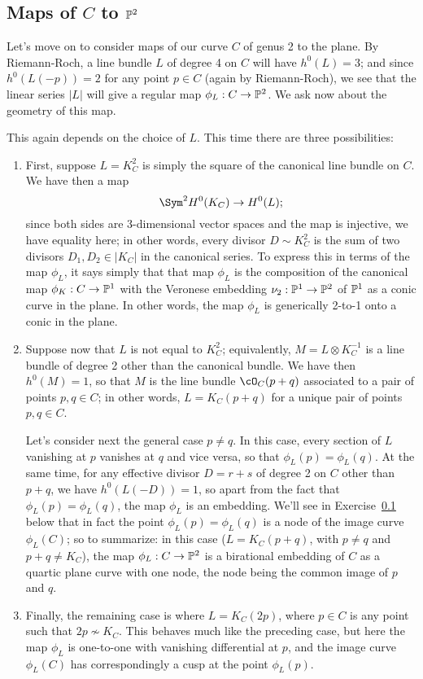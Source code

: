 \subsection{Maps of $C$ to $\PP^2$} Let's move on to consider maps of our curve $C$ of genus 2 to the plane. By Riemann-Roch, a line bundle $L$ of degree 4 on $C$ will have $h^0(L) = 3$; and since $h^0(L(-p)) = 2$ for any point $p \in C$ (again by Riemann-Roch), we see that the linear series $|L|$ will give a regular map $\phi_L : C \to \PP^2$. We ask now about the geometry of this map.

This again depends on the choice of $L$. This time there are three possibilities:

\begin{enumerate}
\item First, suppose $L = K_C^2$ is simply the square of the canonical line bundle on $C$. We have then a map
$$
\Sym^2 H^0(K_C) \to H^0(L);
$$
since both sides are 3-dimensional vector spaces and the map is injective, we have equality here; in other words, every divisor $D \sim K_C^2$ is the sum of two divisors $D_1, D_2 \in |K_C|$ in the canonical series. To express this in terms of the map $\phi_L$, it says simply that that map $\phi_L$ is the composition of the canonical map $\phi_K : C \to \PP^1$ with the Veronese embedding $\nu_2 : \PP^1 \to \PP^2$ of $\PP^1$ as a conic curve in the plane. In other words, the map $\phi_L$ is generically 2-to-1 onto a conic in the plane.

\item Suppose now that $L$ is not equal to $K_C^2$; equivalently, $M = L \otimes K_C^{-1}$ is a line bundle of degree 2 other than the canonical bundle. We have then $h^0(M) = 1$, so that $M$ is the line bundle $\cO_C(p+q)$ associated to a pair of points $p, q \in C$; in other words, $L = K_C(p+q)$ for a unique pair of points $p, q \in C$.

Let's consider next the general case $p \neq q$. In this case, every section of $L$ vanishing at $p$ vanishes at $q$ and vice versa, so that $\phi_L(p) = \phi_L(q)$. At the same time, for any effective divisor $D = r+s$ of degree 2 on $C$  other than $p+q$, we have $h^0(L(-D)) = 1$, so apart from the fact that $\phi_L(p) = \phi_L(q)$, the map $\phi_L$ is an embedding. We'll see in Exercise~\ref{} below that in fact the point $\phi_L(p) = \phi_L(q)$ is a node of the image curve $\phi_L(C)$; so to summarize: in this case ($L = K_C(p+q)$, with $p \neq q$ and $p+q \neq K_C$), the map $\phi_L : C \to \PP^2$ is a birational embedding of $C$ as a quartic plane curve with one node, the node being the common image of $p$ and $q$.

\item Finally, the remaining case is where $L = K_C(2p)$, where $p \in C$ is any point such that $2p \not\sim K_C$. This behaves much like the preceding case, but here the map $\phi_L$ is one-to-one with vanishing differential at $p$, and the image curve $\phi_L(C)$ has correspondingly a cusp at the point $\phi_L(p)$.
\end{enumerate}

